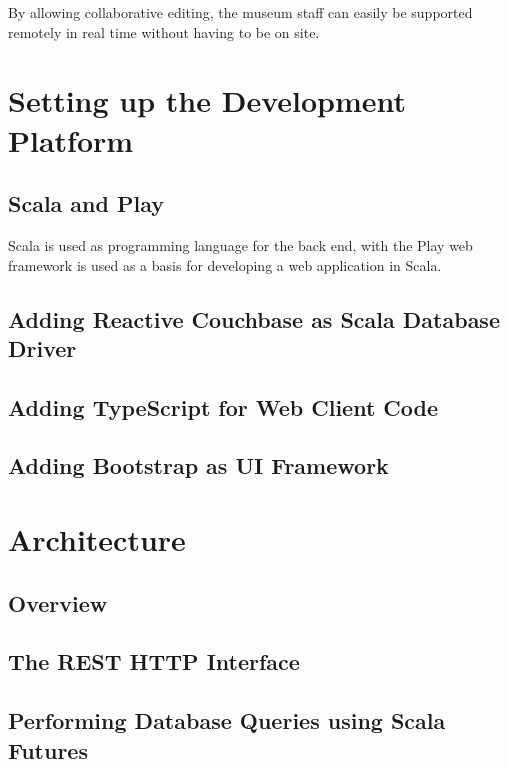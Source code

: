 By allowing collaborative editing, the museum staff can easily be supported remotely in real time without having to be on site. 


\section{Setting up the Development Platform}

\subsection{Scala and Play}

Scala is used as programming language for the back end, with the Play web framework is used as a basis for developing a web application in Scala.


\subsection{Adding Reactive Couchbase as Scala Database Driver}


\subsection{Adding TypeScript for Web Client Code}


\subsection{Adding Bootstrap as UI Framework}


\section{Architecture}

\subsection{Overview}


\subsection{The REST HTTP Interface}


\subsection{Performing Database Queries using Scala Futures}













